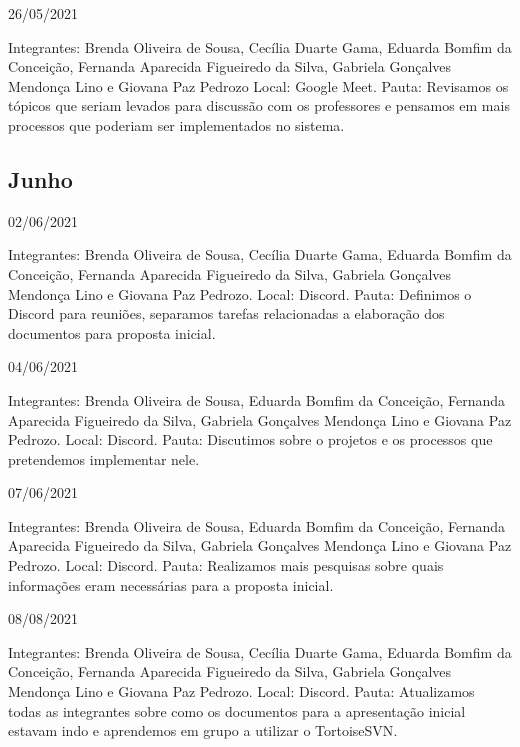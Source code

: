 \begin{apendicesenv}
\begin{flushleft}
26/05/2021

Integrantes: Brenda Oliveira de Sousa, Cecília Duarte Gama, Eduarda Bomfim da Conceição, Fernanda Aparecida Figueiredo da Silva, Gabriela Gonçalves Mendonça Lino e Giovana Paz Pedrozo
\newline
Local: \gls{Google Meet}.
\newline
Pauta: Revisamos os tópicos que seriam levados para discussão com os professores e pensamos em mais processos que poderiam ser implementados no sistema.
\end{flushleft}

\begin{flushleft}
 \section{Junho}
 02/06/2021 

Integrantes: Brenda Oliveira de Sousa, Cecília Duarte Gama, Eduarda Bomfim da Conceição, Fernanda Aparecida Figueiredo da Silva, Gabriela Gonçalves Mendonça Lino e Giovana Paz Pedrozo.
\newline
Local: \gls{Discord}.
\newline
Pauta:  Definimos o \gls{Discord} para reuniões, separamos tarefas relacionadas a elaboração dos documentos para proposta inicial.

04/06/2021 

Integrantes: Brenda Oliveira de Sousa, Eduarda Bomfim da Conceição, Fernanda Aparecida Figueiredo da Silva, Gabriela Gonçalves Mendonça Lino e Giovana Paz Pedrozo.
\newline
Local: \gls{Discord}.
\newline
Pauta: Discutimos sobre o projetos e os processos que pretendemos implementar nele.

07/06/2021 

Integrantes: Brenda Oliveira de Sousa, Eduarda Bomfim da Conceição, Fernanda Aparecida Figueiredo da Silva, Gabriela Gonçalves Mendonça Lino e Giovana Paz Pedrozo.
\newline
Local: \gls{Discord}.
\newline
Pauta: Realizamos mais pesquisas sobre quais informações eram necessárias para a proposta inicial.

08/08/2021 

Integrantes: Brenda Oliveira de Sousa, Cecília Duarte Gama, Eduarda Bomfim da Conceição, Fernanda Aparecida Figueiredo da Silva, Gabriela Gonçalves Mendonça Lino e Giovana Paz Pedrozo.
\newline
Local: \gls{Discord}.
\newline
Pauta: Atualizamos todas as integrantes sobre como os documentos para a apresentação inicial estavam indo e aprendemos em grupo a utilizar o \gls{TortoiseSVN}.


\end{flushleft}
\end{apendicesenv}

